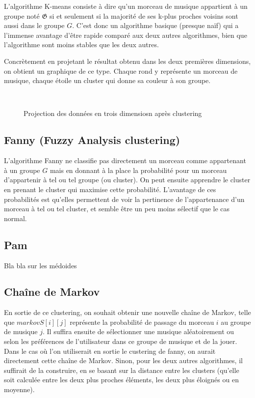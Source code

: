 \documentclass{report}
\begin{document}
L'algorithme K-means consiste à dire qu'un morceau de musique appartient à un groupe noté $\mathfrak{G}$ si et seulement si la majorité de ses k-plus proches voisins sont aussi dans le groupe $G$. C'est donc un algorithme basique (presque naïf) qui a l'immense avantage d'être rapide comparé aux deux autres algorithmes, bien que l'algorithme sont moins stables que les deux autres.

Concrètement en projetant le résultat obtenu dans les deux premières dimensions, on obtient un graphique de ce type. Chaque rond y représente un morceau de musique, chaque étoile un cluster qui donne sa couleur à son groupe.


\begin{figure}[H]
\centering
{}
\\
\caption{Projection des données en trois dimensiosn après clustering}
\end{figure}

\subsection{Fanny (Fuzzy Analysis clustering)}

L'algorithme Fanny ne classifie pas directement un morceau comme appartenant à un groupe $G$ mais en donnant à la place la probabilité pour un morceau d'appartenir à tel ou tel groupe (ou cluster). On peut ensuite apprendre le cluster en prenant le cluster qui maximise cette probabilité. L'avantage de ces probabilités est qu'elles permettent de voir la pertinence de l'appartenance d'un morceau à tel ou tel cluster, et semble être un peu moins sélectif que le cas normal.

\subsection{Pam}

Bla bla sur les médoides


\subsection{Chaîne de Markov}

En sortie de ce clustering, on souhait obtenir une nouvelle chaîne de Markov, telle que $markovS[i][j]$ représente la probabilité de passage du morceau $i$ au groupe de musique $j$. Il suffira ensuite de sélectionner une musique aléatoirement ou selon les préférences de l'utilisateur dans ce groupe de musique et de la jouer. Dans le cas où l'on utiliserait en sortie le custering de fanny, on aurait directement cette chaîne de Markov. Sinon, pour les deux autres algorithmes, il suffirait de la construire, en se basant sur la distance entre les clusters (qu'elle soit calculée entre les deux plus proches éléments, les deux plus éloignés ou en moyenne).
\end{document}
